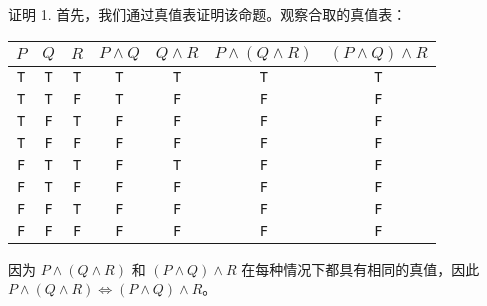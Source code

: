 \begin{proofs}{证明 1. }
    首先，我们通过真值表证明该命题。观察合取的真值表：
    \begin{center}
        \begin{tabular}{c|c|c|c|c|c|c}
              $P$    & $Q$   & $R$ & $P \land Q$ &  $Q \land R$  & $P \land (Q \land R)$ & $(P \land Q) \land R$ \\
              \hline
              \verb|T| & \verb|T| & \verb|T| &  \verb|T|  &    \verb|T|    &\verb|T| &    \verb|T|    \\
              \verb|T| & \verb|T| & \verb|F| &  \verb|T|  &    \verb|F|    &\verb|F| &    \verb|F|    \\
              \verb|T| & \verb|F| & \verb|T| &  \verb|F|  &    \verb|F|    &\verb|F| &    \verb|F|    \\
              \verb|T| & \verb|F| & \verb|F| &  \verb|F|  &    \verb|F|    &\verb|F| &    \verb|F|    \\
              \verb|F| & \verb|T| & \verb|T| &  \verb|F|  &    \verb|T|    &\verb|F| &    \verb|F|    \\
              \verb|F| & \verb|T| & \verb|F| &  \verb|F|  &    \verb|F|    &\verb|F| &    \verb|F|    \\
              \verb|F| & \verb|F| & \verb|T| &  \verb|F|  &    \verb|F|    &\verb|F| &    \verb|F|    \\
              \verb|F| & \verb|F| & \verb|F| &  \verb|F|  &    \verb|F|    &\verb|F| &    \verb|F|    \\
        \end{tabular}
    \end{center}

    因为 $P \land (Q \land R)$ 和 $(P \land Q) \land R$ 在每种情况下都具有相同的真值，因此 $P \land (Q \land R) \iff (P \land Q) \land R$。\\


\end{proofs}
